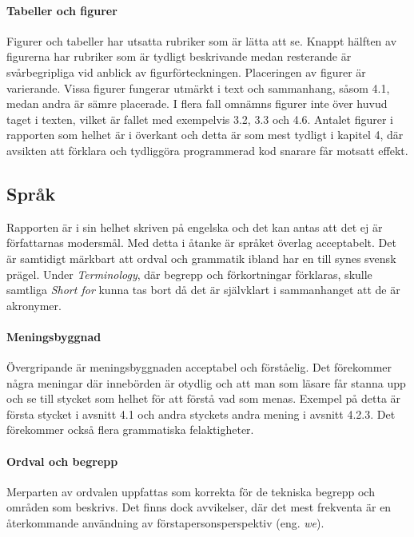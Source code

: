     \paragraph{Tabeller och figurer}
        Figurer och tabeller har utsatta rubriker som är lätta att se. Knappt hälften av figurerna har rubriker som är tydligt beskrivande medan resterande är svårbegripliga vid anblick av figurförteckningen. Placeringen av figurer är varierande. Vissa figurer fungerar utmärkt i text och sammanhang, såsom 4.1, medan andra är sämre placerade. I flera fall omnämns figurer inte över huvud taget i texten, vilket är fallet med exempelvis 3.2, 3.3 och 4.6. Antalet figurer i rapporten som helhet är i överkant och detta är som mest tydligt i kapitel 4, där avsikten att förklara och tydliggöra programmerad kod snarare får motsatt effekt.
    


    \subsection{Språk} %
    \label{sub:sprak}
    Rapporten är i sin helhet skriven på engelska och det kan antas att det ej är författarnas modersmål. Med detta i åtanke är språket överlag acceptabelt. Det är samtidigt märkbart att ordval och grammatik ibland har en till synes svensk prägel. Under \emph{Terminology}, där begrepp och förkortningar förklaras, skulle samtliga \emph{Short for} kunna tas bort då det är självklart i sammanhanget att de är akronymer.

    \paragraph{Meningsbyggnad}
        Övergripande är meningsbyggnaden acceptabel och förståelig. Det förekommer några meningar där innebörden är otydlig och att man som läsare får stanna upp och se till stycket som helhet för att förstå vad som menas. Exempel på detta är första stycket i avsnitt 4.1 och andra styckets andra mening i avsnitt 4.2.3. Det förekommer också flera grammatiska felaktigheter.

    \paragraph{Ordval och begrepp}
        Merparten av ordvalen uppfattas som korrekta för de tekniska begrepp och områden som beskrivs. Det finns dock avvikelser, där det mest frekventa är en återkommande användning av förstapersonsperspektiv (eng. \emph{we}). 

